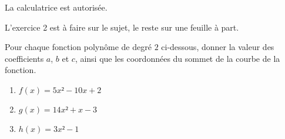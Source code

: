 \documentclass[
	classe=$1^{ere}STI2D$,
	headerTitle=Évaluation\space Chapitre\space 4
]{évaluation}
\begin{document}
\begin{tcolorbox}
	La calculatrice est autorisée.

	L'exercice 2 est à faire sur le sujet, le reste sur une feuille à part.
\end{tcolorbox}

\begin{exercice}
	Pour chaque fonction polynôme de degré $2$ ci-dessous, donner la valeur des coefficients $a$, $b$ et $c$, ainsi que les coordonnées du sommet de la courbe de la fonction.
	\begin{enumerate}
		\item $f(x) = 5x² - 10x + 2$
		\item $g(x) = 14x² + x - 3$
		\item $h(x) = 3x² - 1$
	\end{enumerate}
\end{exercice}
\end{document}
